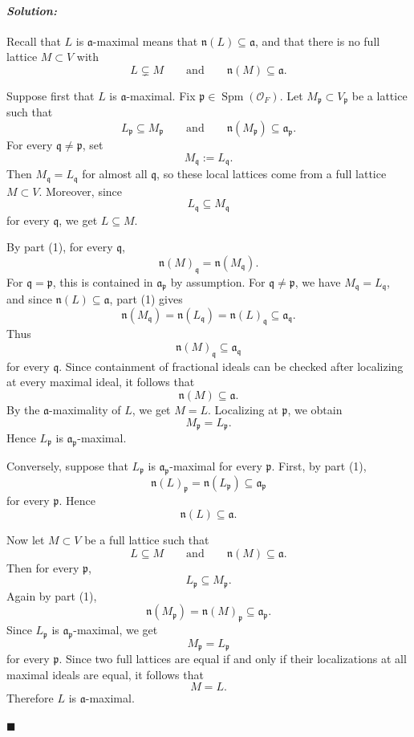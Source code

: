 \documentclass[12pt, a4paper]{article}
\newenvironment{solution}
  {\paragraph{\textit{Solution:}}\par\medskip}
  {\hfill$\blacksquare$\vspace{0.1cm}}
\begin{document}
\begin{solution}
\begin{enumerate}
Recall that \(L\) is \(\mathfrak a\)-maximal means that
\(\mathfrak n(L)\subseteq \mathfrak a\), and that there is no full lattice
\(M\subset V\) with
\[
L\subsetneq M
\qquad\text{and}\qquad
\mathfrak n(M)\subseteq \mathfrak a .
\]

Suppose first that \(L\) is \(\mathfrak a\)-maximal. Fix
\(\mathfrak p\in \operatorname{Spm}(\mathcal O_F)\). Let
\(M_{\mathfrak p}\subset V_{\mathfrak p}\) be a lattice such that
\[
L_{\mathfrak p}\subseteq M_{\mathfrak p}
\qquad\text{and}\qquad
\mathfrak n(M_{\mathfrak p})\subseteq \mathfrak a_{\mathfrak p}.
\]
For every \(\mathfrak q\neq \mathfrak p\), set
\[
M_{\mathfrak q}:=L_{\mathfrak q}.
\]
Then \(M_{\mathfrak q}=L_{\mathfrak q}\) for almost all
\(\mathfrak q\), so these local lattices come from a full lattice
\(M\subset V\). Moreover, since
\[
L_{\mathfrak q}\subseteq M_{\mathfrak q}
\]
for every \(\mathfrak q\), we get \(L\subseteq M\).

By part (1), for every \(\mathfrak q\),
\[
\mathfrak n(M)_{\mathfrak q}
=
\mathfrak n(M_{\mathfrak q}).
\]
For \(\mathfrak q=\mathfrak p\), this is contained in
\(\mathfrak a_{\mathfrak p}\) by assumption. For
\(\mathfrak q\neq \mathfrak p\), we have
\(M_{\mathfrak q}=L_{\mathfrak q}\), and since
\(\mathfrak n(L)\subseteq \mathfrak a\), part (1) gives
\[
\mathfrak n(M_{\mathfrak q})
=
\mathfrak n(L_{\mathfrak q})
=
\mathfrak n(L)_{\mathfrak q}
\subseteq
\mathfrak a_{\mathfrak q}.
\]
Thus
\[
\mathfrak n(M)_{\mathfrak q}\subseteq \mathfrak a_{\mathfrak q}
\]
for every \(\mathfrak q\). Since containment of fractional ideals can be checked
after localizing at every maximal ideal, it follows that
\[
\mathfrak n(M)\subseteq \mathfrak a.
\]
By the \(\mathfrak a\)-maximality of \(L\), we get \(M=L\). Localizing at
\(\mathfrak p\), we obtain
\[
M_{\mathfrak p}=L_{\mathfrak p}.
\]
Hence \(L_{\mathfrak p}\) is \(\mathfrak a_{\mathfrak p}\)-maximal.

Conversely, suppose that \(L_{\mathfrak p}\) is
\(\mathfrak a_{\mathfrak p}\)-maximal for every \(\mathfrak p\). First, by
part (1),
\[
\mathfrak n(L)_{\mathfrak p}
=
\mathfrak n(L_{\mathfrak p})
\subseteq
\mathfrak a_{\mathfrak p}
\]
for every \(\mathfrak p\). Hence
\[
\mathfrak n(L)\subseteq \mathfrak a.
\]

Now let \(M\subset V\) be a full lattice such that
\[
L\subseteq M
\qquad\text{and}\qquad
\mathfrak n(M)\subseteq \mathfrak a.
\]
Then for every \(\mathfrak p\),
\[
L_{\mathfrak p}\subseteq M_{\mathfrak p}.
\]
Again by part (1),
\[
\mathfrak n(M_{\mathfrak p})
=
\mathfrak n(M)_{\mathfrak p}
\subseteq
\mathfrak a_{\mathfrak p}.
\]
Since \(L_{\mathfrak p}\) is \(\mathfrak a_{\mathfrak p}\)-maximal, we get
\[
M_{\mathfrak p}=L_{\mathfrak p}
\]
for every \(\mathfrak p\). Since two full lattices are equal if and only if
their localizations at all maximal ideals are equal, it follows that
\[
M=L.
\]
Therefore \(L\) is \(\mathfrak a\)-maximal. 
\end{enumerate}
\end{solution}
\end{document}
